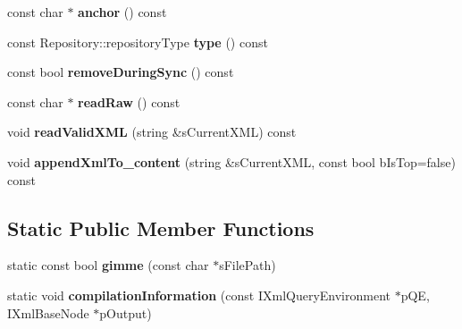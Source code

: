 \begin{DoxyCompactItemize}
\item 
\hypertarget{classgeneral__server_1_1InternetLocation_a9d826a3e6b097a99ded0b799a0438d0c}{const char $\ast$ {\bfseries anchor} () const }\label{classgeneral__server_1_1InternetLocation_a9d826a3e6b097a99ded0b799a0438d0c}

\item 
\hypertarget{classgeneral__server_1_1InternetLocation_ac2773b476327896a3cdf9815be1b4727}{const \-Repository\-::repository\-Type {\bfseries type} () const }\label{classgeneral__server_1_1InternetLocation_ac2773b476327896a3cdf9815be1b4727}

\item 
\hypertarget{classgeneral__server_1_1InternetLocation_a1de3520244087833d8c2aa1bc261fe5f}{const bool {\bfseries remove\-During\-Sync} () const }\label{classgeneral__server_1_1InternetLocation_a1de3520244087833d8c2aa1bc261fe5f}

\item 
\hypertarget{classgeneral__server_1_1InternetLocation_a1bd3d3b385b83b72e0e67afc0a8b0ddf}{const char $\ast$ {\bfseries read\-Raw} () const }\label{classgeneral__server_1_1InternetLocation_a1bd3d3b385b83b72e0e67afc0a8b0ddf}

\item 
\hypertarget{classgeneral__server_1_1InternetLocation_a06af3ea0a6f9ccc4c1c04000a7418353}{void {\bfseries read\-Valid\-X\-M\-L} (string \&s\-Current\-X\-M\-L) const }\label{classgeneral__server_1_1InternetLocation_a06af3ea0a6f9ccc4c1c04000a7418353}

\item 
\hypertarget{classgeneral__server_1_1InternetLocation_ae8b6f621746b4763f275c0f00e770d7c}{void {\bfseries append\-Xml\-To\-\_\-content} (string \&s\-Current\-X\-M\-L, const bool b\-Is\-Top=false) const }\label{classgeneral__server_1_1InternetLocation_ae8b6f621746b4763f275c0f00e770d7c}

\end{DoxyCompactItemize}
\subsection*{\-Static \-Public \-Member \-Functions}
\begin{DoxyCompactItemize}
\item 
\hypertarget{classgeneral__server_1_1InternetLocation_a4ba9882a6792ffa1fd817ea78a60ee1e}{static const bool {\bfseries gimme} (const char $\ast$s\-File\-Path)}\label{classgeneral__server_1_1InternetLocation_a4ba9882a6792ffa1fd817ea78a60ee1e}

\item 
\hypertarget{classgeneral__server_1_1InternetLocation_ad4bf53e302c1ffa6a55889fccc4b27d2}{static void {\bfseries compilation\-Information} (const \-I\-Xml\-Query\-Environment $\ast$p\-Q\-E, \-I\-Xml\-Base\-Node $\ast$p\-Output)}\label{classgeneral__server_1_1InternetLocation_ad4bf53e302c1ffa6a55889fccc4b27d2}

\end{DoxyCompactItemize}
